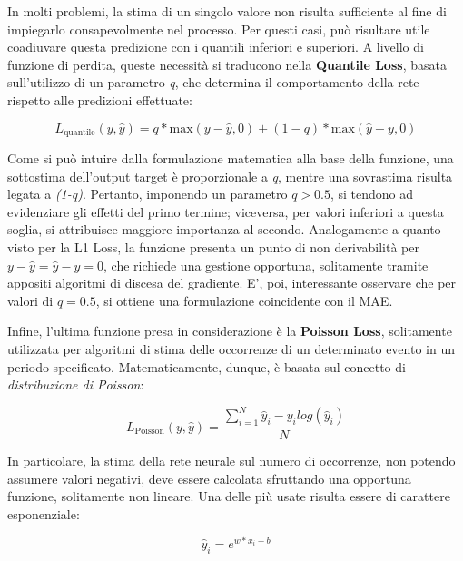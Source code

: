 In molti problemi, la stima di un singolo valore non risulta sufficiente al fine di impiegarlo consapevolmente nel processo. Per questi casi, può risultare utile coadiuvare questa predizione con i quantili inferiori e superiori. A livello di funzione di perdita, queste necessità si traducono nella \textbf{Quantile Loss}, basata sull'utilizzo di un parametro \emph{q}, che determina il comportamento della rete rispetto alle predizioni effettuate:

    \begin{equation}
        L_{\text{quantile}} (y, \hat{y}) = q * \text{max}(y-\hat{y}, 0) + (1-q) * \text{max}(\hat{y}-y, 0)
        \label{eq:Quantile}
    \end{equation}

Come si può intuire dalla formulazione matematica alla base della funzione, una sottostima dell'output target è proporzionale a \emph{q}, mentre una sovrastima risulta legata a \emph{(1-q)}. Pertanto, imponendo un parametro $q > 0.5$, si tendono ad evidenziare gli effetti del primo termine; viceversa, per valori inferiori a questa soglia, si attribuisce maggiore importanza al secondo. Analogamente a quanto visto per la L1 Loss, la funzione presenta un punto di non derivabilità per $y-\hat{y} = \hat{y} - y = 0$, che richiede una gestione opportuna, solitamente tramite appositi algoritmi di discesa del gradiente. E', poi, interessante osservare che per valori di $q = 0.5$, si ottiene una formulazione coincidente con il MAE.

Infine, l'ultima funzione presa in considerazione è la \textbf{Poisson Loss}, solitamente utilizzata per algoritmi di stima delle occorrenze di un determinato evento in un periodo specificato. Matematicamente, dunque, è basata sul concetto di \textit{distribuzione di Poisson}:

    \begin{equation}
        L_{\text{Poisson}}(y, \hat{y}) = \displaystyle \frac{\sum_{i=1}^{N} \hat{y}_{i} - y_{i} log(\hat{y}_{i})}{N}
        \label{eq:Poisson}
    \end{equation}

In particolare, la stima della rete neurale sul numero di occorrenze, non potendo assumere valori negativi, deve essere calcolata sfruttando una opportuna funzione, solitamente non lineare. Una delle più usate risulta essere di carattere esponenziale:

    \begin{equation}
        \hat{y}_{i} = e^{w*x_{i} + b}
        \label{eq:Poisson_pred}
    \end{equation}

